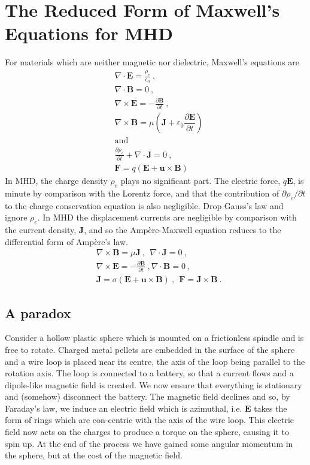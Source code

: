 \documentclass[12pt,a4paper]{article}
\renewcommand{\vec}[1]{\boldsymbol{#1}}
\begin{document}
\section{The Reduced Form of Maxwell's Equations for MHD}
For materials which are neither magnetic nor dielectric, Maxwell's equations are
\begin{align}
& \nabla \cdot \vec{E} = \frac{\rho_e}{\epsilon_0} ~, \\
& \nabla \cdot \vec{B} = 0 ~, \\
& \nabla \times \vec{E} = -\frac{\partial \vec{B}}{\partial t} ~, \\
& \nabla \times \vec{B} = \mu\left( \vec{J} +\varepsilon_0 \dfrac{\partial \vec{E}}{\partial t} \right) \\
& \nonumber \text{and} \\
& \frac{\partial \rho_e}{\partial t} +\nabla \cdot \vec{J} = 0 ~,\\
& \vec{F} = q(\vec{E} +\vec{u}\times \vec{B} )
\end{align}
In MHD, the charge density $\rho_e$ plays no significant part. The electric force, $q \vec{E}$, is minute by comparison with the Lorentz force, and that the contribution of $\partial \rho_e/\partial t$ to the charge conservation equation is also negligible. Drop Gauss's law and ignore $\rho_e$. In MHD the displacement currents are negligible by comparison with the current density, $\vec{J}$, and so the Amp\`ere-Maxwell equation reduces to the differential form of Amp\`ere's law. 
\begin{align}
& \nabla \times \vec{B} = \mu \vec{J}  ~, ~~ \nabla \cdot \vec{J} = 0 ~, \\
& \nabla \times \vec{E} = -\frac{\partial \vec{B}}{\partial t} ~, \nabla \cdot \vec{B} = 0 ~, \\
& \vec{J} = \sigma(\vec{E} + \vec{u} \times \vec{B}) ~, ~~ \vec{F} = \vec{J} \times \vec{B} ~.
\end{align}

\subsection{A paradox}
Consider a hollow plastic sphere which is mounted on a frictionless spindle and is free to rotate. Charged metal pellets are embedded in the surface of the sphere and a wire loop is placed near its centre, the axis of the loop being parallel to the rotation axis. The loop is connected to a battery, so that a current flows and a dipole-like magnetic field is created. We now ensure that everything is stationary and (somehow) disconnect the battery. The magnetic field declines and so, by Faraday's law, we induce an electric field which is azimuthal, i.e. $\vec{E}$ takes the form of rings which are con-centric with the axis of the wire loop. This electric field now acts on the charges to produce a torque on the sphere, causing it to spin up. At the end of the process we have gained some angular momentum in the sphere, but at the cost of the magnetic field.
\end{document}
